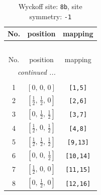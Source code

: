 \documentclass[fleqn,8pt]{jsarticle}
\begin{document}
\begin{longtable}{ccc}
\caption{Wyckoff site: {\tt 8b}, site symmetry: {\tt -1}}
 \\
 \hline \hline
No. & position & mapping \\ \hline \endfirsthead

\multicolumn{2}{l}{\tablename\ \thetable{}} \\
 \hline \hline
No. & position & mapping \\ \hline \endhead

 \hline \hline
\multicolumn{2}{r}{\footnotesize\it continued ...} \\ \endfoot

 \hline \hline
\multicolumn{2}{r}{} \\ \endlastfoot

1 & $\left[ 0,\, 0,\, 0 \right]$ & {\tt [1,5]} \\ \hline
2 & $\left[ \frac{1}{2},\, \frac{1}{2},\, 0 \right]$ & {\tt [2,6]} \\ \hline
3 & $\left[ 0,\, \frac{1}{2},\, \frac{1}{2} \right]$ & {\tt [3,7]} \\ \hline
4 & $\left[ \frac{1}{2},\, 0,\, \frac{1}{2} \right]$ & {\tt [4,8]} \\ \hline
5 & $\left[ \frac{1}{2},\, \frac{1}{2},\, \frac{1}{2} \right]$ & {\tt [9,13]} \\ \hline
6 & $\left[ 0,\, 0,\, \frac{1}{2} \right]$ & {\tt [10,14]} \\ \hline
7 & $\left[ \frac{1}{2},\, 0,\, 0 \right]$ & {\tt [11,15]} \\ \hline
8 & $\left[ 0,\, \frac{1}{2},\, 0 \right]$ & {\tt [12,16]} \\
\end{longtable}
\renewcommand{\arraystretch}{1.2}
\end{document}
